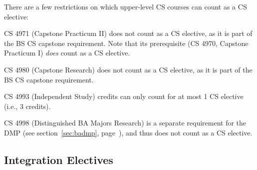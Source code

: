 There are a few restrictions on which upper-level CS courses can count
as a CS elective:

\begin{itemlist}
\item CS 4971 (Capstone Practicum II) does not count as a CS elective,
as it is part of the BS CS capstone requirement.  Note that its
prerequisite (CS 4970, Capstone Practicum I) {\em does} count as a CS
elective.
\item CS 4980 (Capstone Research) does not count as a CS elective, as
it is part of the BS CS capstone requirement.
\item CS 4993 (Independent Study) credits can only count for at most 1
CS elective (i.e., 3 credits).
\item CS 4998 (Distinguished BA Majors Research) is a separate
  requirement for the DMP (see section~\ref{sec:badmp},
  page~\pageref{sec:badmp}), and thus does not count as a CS elective.
\end{itemlist}

\subsection{Integration Electives}
\label{sec:bacs-integrationelectives}






%
%
%
%
%
%


